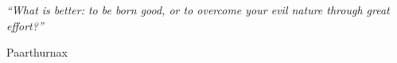 \begin{epigrafe}
    \vspace*{\fill}
	\begin{flushright}
		\textit{``What is better: to be born good, or to overcome your evil nature through great effort?''}

		Paarthurnax
	\end{flushright}
\end{epigrafe}